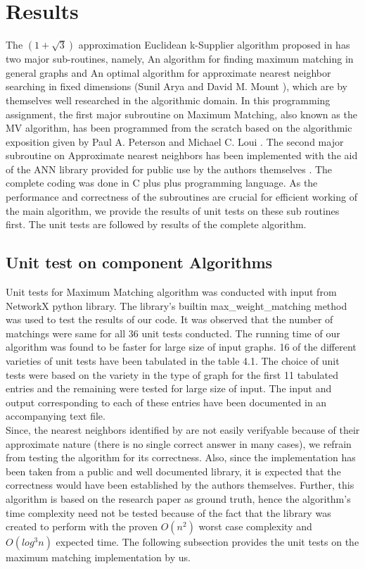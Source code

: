 \documentclass[12pt, a4paper]{article}
\begin{document}
\section{Results}
The $(1+\sqrt{3})$ approximation Euclidean k-Supplier algorithm proposed in \cite{EuclideanKS} has two major sub-routines, namely, An algorithm for ﬁnding maximum matching in general graphs \cite{MicaliVazirani} and An optimal algorithm for approximate nearest neighbor searching in ﬁxed dimensions  (Sunil Arya and David M. Mount \cite{ANN}), which are by themselves well researched in the algorithmic domain. In this programming assignment, the first major subroutine on Maximum Matching, also known as the MV algorithm, has been programmed from the scratch based on the algorithmic exposition given by Paul A. Peterson and Michael C. Loui \cite{Exposition}. The second major subroutine on Approximate nearest neighbors has been implemented with the aid of the ANN library provided for public use by the authors themselves \cite{ANNLibrary}. The complete coding was done in C plus plus programming language. As the performance and correctness of the subroutines are crucial for efficient working of the main algorithm, we provide the results of unit tests on these sub routines first. The unit tests are followed by results of the complete algorithm.\\
\subsection{Unit test on component Algorithms}
Unit tests for Maximum Matching algorithm was conducted with input from NetworkX python library. The library's builtin max\_weight\_matching method was used to test the results of our code. It was observed that the number of matchings were same for all 36 unit tests conducted. The running time of our algorithm was found to be faster for large size of input graphs. 16 of the different varieties of unit tests have been tabulated in the table 4.1. The choice of unit tests were based on the variety in the type of graph for the first 11 tabulated entries and the remaining were tested for large size of input. The input and output corresponding to each of these entries have been documented in an accompanying text file.\\
Since, the nearest neighbors identified by \cite{ANN} are not easily verifyable because of their approximate nature (there is no single correct answer in many cases), we refrain from testing the algorithm for its correctness. Also, since the implementation has been taken from a public and well documented library, it is expected that the correctness would have been established by the authors themselves. Further, this algorithm is based on the research paper \cite{ANN} as ground truth, hence the algorithm's time complexity need not be tested because of the fact that the library was created to perform with the proven $O(n^2)$ worst case complexity and $O(log^3 n)$ expected time. The following subsection provides the unit tests on the maximum matching implementation by us.
\end{document}
